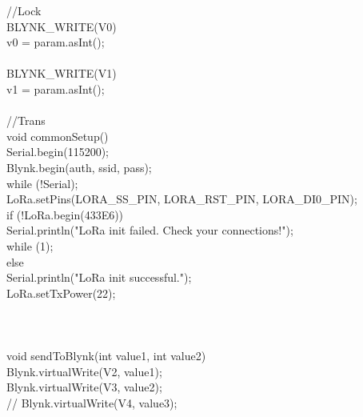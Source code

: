\documentclass[conference, onecolumn]{IEEEtran}
\begin{document}
//Lock\\
BLYNK_WRITE(V0) {\\
  v0 = param.asInt();\\
}\\

BLYNK_WRITE(V1) {\\
  v1 = param.asInt();\\
}\\

//Trans\\
void commonSetup() {\\
  Serial.begin(115200);\\
  Blynk.begin(auth, ssid, pass);\\
  while (!Serial);\\
 
  LoRa.setPins(LORA_SS_PIN, LORA_RST_PIN, LORA_DI0_PIN);\\
  if (!LoRa.begin(433E6)) {\\
    Serial.println("LoRa init failed. Check your connections!");\\
    while (1);\\
  } else {\\
    Serial.println("LoRa init successful.");\\
    LoRa.setTxPower(22);\\
  }\\\\
}\\

void sendToBlynk(int value1, int value2) {\\
  Blynk.virtualWrite(V2, value1);\\
  Blynk.virtualWrite(V3, value2);\\
//  Blynk.virtualWrite(V4, value3);\\
  
}\\
\end{document}
